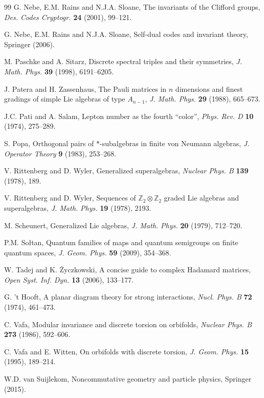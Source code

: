 \documentclass[11pt]{amsart}
\theoremstyle{definition}
\begin{document}
\begin{thebibliography}{99}
 G. Nebe, E.M. Rains and N.J.A. Sloane, The invariants of the Clifford groups, {\em Des. Codes Cryptogr.} {\bf 24} (2001), 99--121.

 G. Nebe, E.M. Rains and N.J.A. Sloane, Self-dual codes and invariant theory, Springer (2006).

 M. Paschke and A. Sitarz, Discrete spectral triples and their symmetries, {\em J. Math. Phys.} {\bf 39} (1998), 6191--6205.

 J. Patera and H. Zassenhaus, The Pauli matrices in $n$ dimensions and finest gradings of simple Lie algebras of type $A_{n-1}$, {\em J. Math. Phys.} {\bf 29} (1988), 665--673.

 J.C. Pati and A. Salam, Lepton number as the fourth ``color'', {\em Phys. Rev. D} {\bf 10} (1974), 275--289.

 S. Popa, Orthogonal pairs of $*$-subalgebras in finite von Neumann algebras, {\em J. Operator Theory} {\bf 9} (1983), 253--268.

 V. Rittenberg and D. Wyler, Generalized superalgebras, {\em Nuclear Phys. B} {\bf 139} (1978), 189.

 V. Rittenberg and D. Wyler, Sequences of $\mathbb Z_2\otimes\mathbb Z_2$ graded Lie algebras and superalgebras, {\em J. Math. Phys.} {\bf 19} (1978), 2193.

 M. Scheunert, Generalized Lie algebras, {\em J. Math. Phys.} {\bf 20} (1979), 712--720.

 P.M. So\l tan, Quantum families of maps and quantum semigroups on finite quantum spaces, {\em J. Geom. Phys.} {\bf 59} (2009), 354--368.

 W. Tadej and K. \.Zyczkowski, A concise guide to complex Hadamard matrices, {\em Open Syst. Inf. Dyn.} {\bf 13} (2006), 133--177.

 G. 't Hooft, A planar diagram theory for strong interactions, {\em Nucl. Phys. B} {\bf 72} (1974), 461--473.

 C. Vafa, Modular invariance and discrete torsion on orbifolds, {\em Nuclear Phys. B} {\bf 273} (1986), 592--606.

 C. Vafa and E. Witten, On orbifolds with discrete torsion, {\em J. Geom. Phys.} {\bf 15} (1995), 189--214.

 W.D. van Suijlekom, Noncommutative geometry and particle physics, Springer (2015).


\end{thebibliography}
\end{document}
